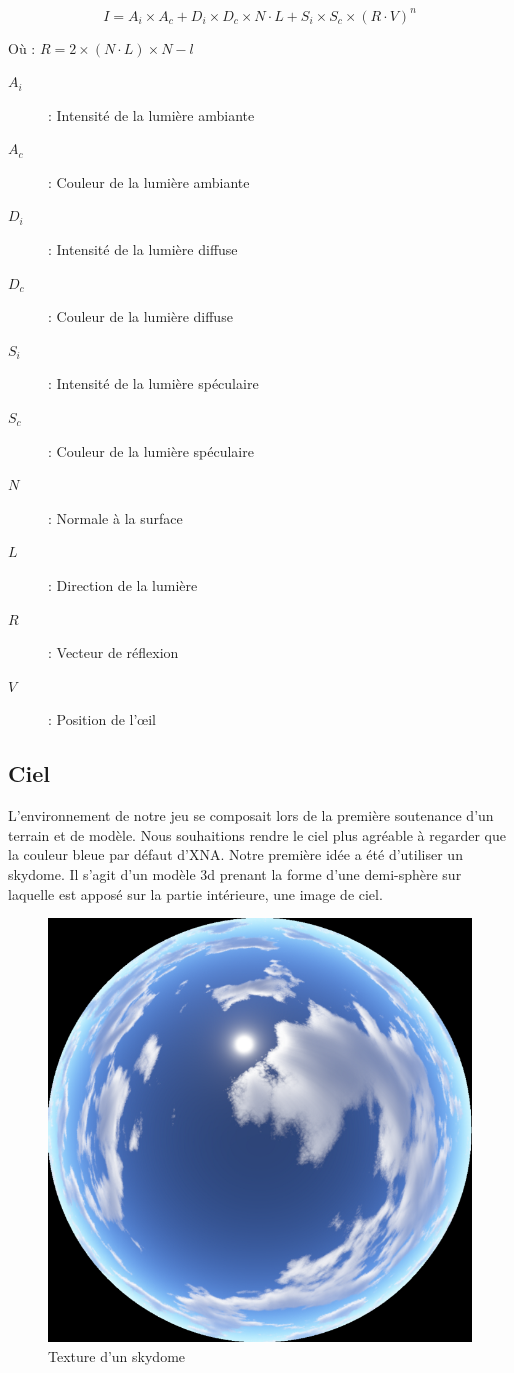 \documentclass[11pt]{report}
\begin{document}
\[ I=A_{i}\times A_{c}+D_{i}\times D_{c}\times N\cdot L + S_{i}\times S_{c} \times \left(R\cdot V\right)^{n} \]

Où : \( R=2\times \left(N\cdot L\right)\times N-l \)

\begin{description}
\item[\(A_{i}\)] : Intensité de la lumière ambiante
\item[\(A_{c}\)] : Couleur de la lumière ambiante
\item[\(D_{i}\)] : Intensité de la lumière diffuse
\item[\(D_{c}\)] : Couleur de la lumière diffuse
\item[\(S_{i}\)] : Intensité de la lumière spéculaire
\item[\(S_{c}\)] : Couleur de la lumière spéculaire
\item[\(N\)] : Normale à la surface
\item[\(L\)] : Direction de la lumière
\item[\(R\)] : Vecteur de réflexion
\item[\(V\)] : Position de l'œil
\end{description}

\subsection{Ciel}

L’environnement de notre jeu se composait lors de la première soutenance d’un terrain et de modèle. Nous souhaitions rendre le ciel plus agréable à regarder que la couleur bleue par défaut d’XNA. Notre première idée a été d’utiliser un skydome. Il s’agit d’un modèle 3d prenant la forme d’une demi-sphère sur laquelle est apposé sur la partie intérieure, une image de ciel.

\begin{figure}[htbp]
\centering
\includegraphics[scale=0.4]{skydome_texture.png}
\caption{Texture d'un skydome}
\end{figure}
\end{document}
